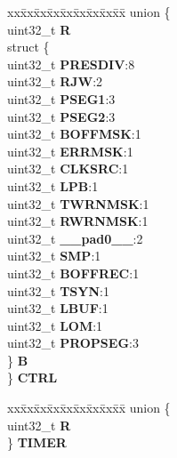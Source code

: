 \begin{DoxyCompactItemize}
\begin{tabbing}
\end{tabbing}\item 
\mbox{\label{structFLEXCAN__tag_ae0e6327ca95a215af3781263b55c515e}} 
\begin{tabbing}
xx\=xx\=xx\=xx\=xx\=xx\=xx\=xx\=xx\=\kill
union \{\\
\>uint32\_t {\bfseries R}\\
\>struct \{\\
\>\>uint32\_t {\bfseries PRESDIV}:8\\
\>\>uint32\_t {\bfseries RJW}:2\\
\>\>uint32\_t {\bfseries PSEG1}:3\\
\>\>uint32\_t {\bfseries PSEG2}:3\\
\>\>uint32\_t {\bfseries BOFFMSK}:1\\
\>\>uint32\_t {\bfseries ERRMSK}:1\\
\>\>uint32\_t {\bfseries CLKSRC}:1\\
\>\>uint32\_t {\bfseries LPB}:1\\
\>\>uint32\_t {\bfseries TWRNMSK}:1\\
\>\>uint32\_t {\bfseries RWRNMSK}:1\\
\>\>uint32\_t {\bfseries \_\_pad0\_\_}:2\\
\>\>uint32\_t {\bfseries SMP}:1\\
\>\>uint32\_t {\bfseries BOFFREC}:1\\
\>\>uint32\_t {\bfseries TSYN}:1\\
\>\>uint32\_t {\bfseries LBUF}:1\\
\>\>uint32\_t {\bfseries LOM}:1\\
\>\>uint32\_t {\bfseries PROPSEG}:3\\
\>\} {\bfseries B}\\
\} {\bfseries CTRL}\\

\end{tabbing}\item 
\mbox{\label{structFLEXCAN__tag_aa73a380ac7067d1dccc1bbfa66b1f6ed}} 
\begin{tabbing}
xx\=xx\=xx\=xx\=xx\=xx\=xx\=xx\=xx\=\kill
union \{\\
\>uint32\_t {\bfseries R}\\
\} {\bfseries TIMER}\\


\end{tabbing}
\end{DoxyCompactItemize}
